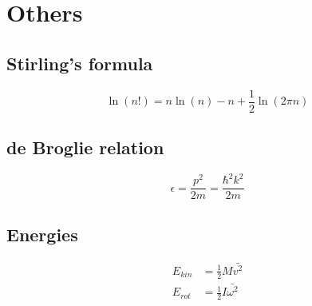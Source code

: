 \section{Others}

\subsection*{Stirling's formula}

\[
    \ln (n!) = n  \ln (n) - n + \frac{1}{2} \ln (2 \pi n)
\]

\subsection*{de Broglie relation}

\[
    \epsilon = \frac{p^2}{2m} = \frac{\hbar^2 k^2}{2m}
\]

\subsection*{Energies}
\[
    \begin{aligned}
        E_{kin} &= \frac{1}{2} M \bar{v^2} \\
        E_{rot} &= \frac{1}{2} I \bar{\omega^2}
    \end{aligned}
\]